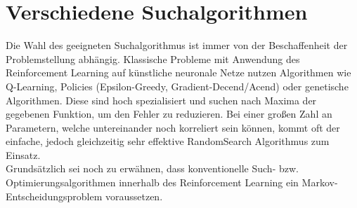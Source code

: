 \section{Verschiedene Suchalgorithmen}
\label{sec:rl_alt}
	Die Wahl des geeigneten Suchalgorithmus ist immer von der Beschaffenheit der Problemstellung abhängig. Klassische Probleme mit Anwendung des Reinforcement Learning auf künstliche neuronale Netze nutzen Algorithmen wie Q-Learning, Policies (Epsilon-Greedy, Gradient-Decend/Acend) oder genetische Algorithmen. Diese sind hoch spezialisiert und suchen nach Maxima der gegebenen Funktion, um den Fehler zu reduzieren. Bei einer großen Zahl an Parametern, welche untereinander noch korreliert sein können, kommt oft der einfache, jedoch gleichzeitig sehr effektive \glqq RandomSearch\grqq{} Algorithmus zum Einsatz.\\
	Grundsätzlich sei noch zu erwähnen, dass konventionelle Such- bzw. Optimierungsalgorithmen innerhalb des Reinforcement Learning ein Markov-Entscheidungsproblem voraussetzen. 

